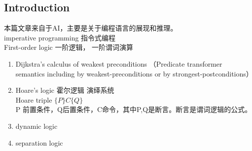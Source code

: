 \documentclass[
10pt, %
a4paper, %
onecolumn, %
portrait %
]{article}
\begin{document}
\begin{CJK*}{UTF8}{gbsn}
\pagestyle{myheadings} %
\markright{\doctitle} %


\thispagestyle{plain} %

\printtitle %


\section*{Introduction} %

本篇文章来自于AI，主要是关于编程语言的展现和推理。
\\ imperative programming 指令式编程 
\\ First-order logic 一阶逻辑， 一阶谓词演算

\begin{enumerate}
\item Dijkstra’s calculus of weakest preconditions （Predicate transformer semantics including by weakest-preconditions or by strongest-postconditions）
\item Hoare’s  logic 霍尔逻辑 演绎系统
\\  Hoare triple \( \{P\}C\{Q\}\)  
\\ P 前置条件，Q后置条件，C命令，其中P,Q是断言。断言是谓词逻辑的公式。
\item dynamic  logic
\item separation  logic
\end{enumerate}


\end{CJK*}
\end{document}
